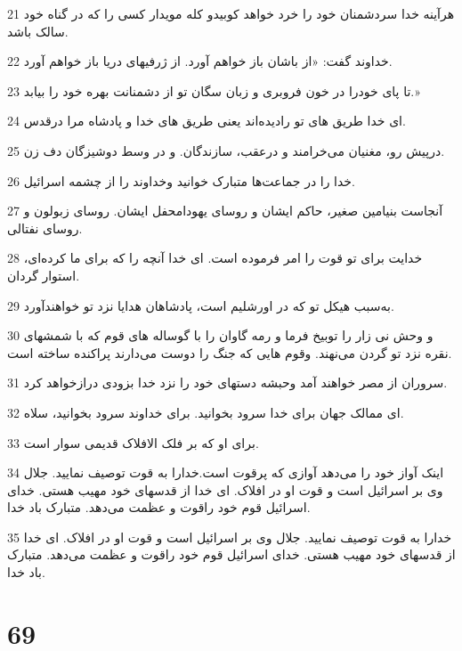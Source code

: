 \par 21 هرآینه خدا سردشمنان خود را خرد خواهد کوبیدو کله مویدار کسی را که در گناه خود سالک باشد.
\par 22 خداوند گفت: «از باشان باز خواهم آورد. از ژرفیهای دریا باز خواهم آورد.
\par 23 تا پای خودرا در خون فروبری و زبان سگان تو از دشمنانت بهره خود را بیابد.»
\par 24 ‌ای خدا طریق های تو رادیده‌اند یعنی طریق های خدا و پادشاه مرا درقدس.
\par 25 در‌پیش رو، مغنیان می‌خرامند و درعقب، سازندگان. و در وسط دوشیزگان دف زن.
\par 26 خدا را در جماعت‌ها متبارک خوانید وخداوند را از چشمه اسرائیل.
\par 27 آنجاست بنیامین صغیر، حاکم ایشان و روسای یهودامحفل ایشان. روسای زبولون و روسای نفتالی.
\par 28 خدایت برای تو قوت را امر فرموده است. ای خدا آنچه را که برای ما کرده‌ای، استوار گردان.
\par 29 به‌سبب هیکل تو که در اورشلیم است، پادشاهان هدایا نزد تو خواهند‌آورد.
\par 30 و وحش نی زار را توبیخ فرما و رمه گاوان را با گوساله های قوم که با شمشهای نقره نزد تو گردن می‌نهند. وقوم هایی که جنگ را دوست می‌دارند پراکنده ساخته است.
\par 31 سروران از مصر خواهند آمد وحبشه دستهای خود را نزد خدا بزودی درازخواهد کرد.
\par 32 ‌ای ممالک جهان برای خدا سرود بخوانید. برای خداوند سرود بخوانید، سلاه.
\par 33 برای او که بر فلک الافلاک قدیمی سوار است.
\par 34 اینک آواز خود را می‌دهد آوازی که پرقوت است.خدارا به قوت توصیف نمایید. جلال وی بر اسرائیل است و قوت او در افلاک. ‌ای خدا از قدسهای خود مهیب هستی. خدای اسرائیل قوم خود راقوت و عظمت می‌دهد. متبارک باد خدا.
\par 35 خدارا به قوت توصیف نمایید. جلال وی بر اسرائیل است و قوت او در افلاک. ‌ای خدا از قدسهای خود مهیب هستی. خدای اسرائیل قوم خود راقوت و عظمت می‌دهد. متبارک باد خدا.
 
\chapter{69}

